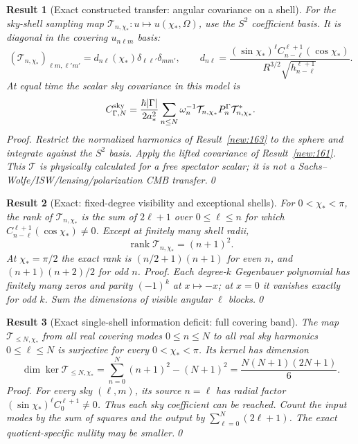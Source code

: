 \documentclass[aps,prd,onecolumn,notitlepage,groupedaddress,11pt]{revtex4-2}
\newtheorem{result}{Result}
\begin{document}
\begin{result}[\textsf{Exact constructed transfer}: angular covariance on a shell]\label{new:164}
For the sky-shell sampling map $\mathcal T_{n,\chi_*}:u\mapsto u(\chi_*,\Omega)$, use the $S^2$ coefficient basis. It is diagonal in the covering $u_{n\ell m}$ basis:
\begin{equation}\label{new:eq164}
 (\mathcal T_{n,\chi_*})_{\ell m,\ell'm'}=d_{n\ell}(\chi_*)\delta_{\ell\ell'}\delta_{mm'},\qquad
 d_{n\ell}=\frac{(\sin\chi_*)^\ell C_{n-\ell}^{\ell+1}(\cos\chi_*)}{R^{3/2}\sqrt{h_{n-\ell}^{\ell+1}}}.
\end{equation}
At equal time the scalar sky covariance in this model is
\begin{equation}\label{new:eq164b}
 C^{\rm sky}_{\Gamma,N}=\frac{\hbar|\Gamma|}{2a_*^2}\sum_{n\le N}\omega_n^{-1}\mathcal T_{n,\chi_*}P_n^\Gamma\mathcal T_{n,\chi_*}^{*}.
\end{equation}
\textit{Proof.} Restrict the normalized harmonics of Result~\ref{new:163} to the sphere and integrate against the $S^2$ basis. Apply the lifted covariance of Result~\ref{new:161}. This $\mathcal T$ is physically calculated for a free spectator scalar; it is \emph{not} a Sachs--Wolfe/ISW/lensing/polarization CMB transfer.\qed
\end{result}

\begin{result}[\textsf{Exact}: fixed-degree visibility and exceptional shells]\label{new:165}
For $0<\chi_*<\pi$, the rank of $\mathcal T_{n,\chi_*}$ is the sum of $2\ell+1$ over $0\le\ell\le n$ for which $C_{n-\ell}^{\ell+1}(\cos\chi_*)\ne0$. Except at finitely many shell radii,
\begin{equation}\label{new:eq165}
 \operatorname{rank}\mathcal T_{n,\chi_*}=(n+1)^2.
\end{equation}
At $\chi_*=\pi/2$ the exact rank is $(n/2+1)(n+1)$ for even $n$, and $(n+1)(n+2)/2$ for odd $n$. \textit{Proof.} Each degree-$k$ Gegenbauer polynomial has finitely many zeros and parity $(-1)^k$ at $x\mapsto-x$; at $x=0$ it vanishes exactly for odd $k$. Sum the dimensions of visible angular $\ell$ blocks.\qed
\end{result}

\begin{result}[\textsf{Exact single-shell information deficit}: full covering band]\label{new:166}
The map $\mathcal T_{\le N,\chi_*}$ from all real covering modes $0\le n\le N$ to all real sky harmonics $0\le\ell\le N$ is surjective for every $0<\chi_*<\pi$. Its kernel has dimension
\begin{equation}\label{new:eq166}
 \dim\ker\mathcal T_{\le N,\chi_*}=\sum_{n=0}^N(n+1)^2-(N+1)^2
 =\frac{N(N+1)(2N+1)}6.
\end{equation}
\textit{Proof.} For every sky $(\ell,m)$, its source $n=\ell$ has radial factor $(\sin\chi_*)^\ell C_0^{\ell+1}\ne0$. Thus each sky coefficient can be reached. Count the input modes by the sum of squares and the output by $\sum_{\ell=0}^N(2\ell+1)$. The exact quotient-specific nullity may be smaller.\qed
\end{result}
\end{document}
